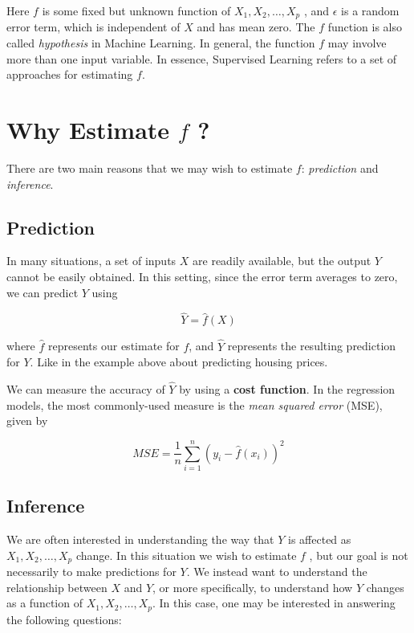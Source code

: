 \documentclass[]{book}
\begin{document}
Here \(f\) is some fixed but unknown function of
\(X_1 , X_2 ,\ldots, X_p\) , and \(\epsilon\) is a random error term,
which is independent of \(X\) and has mean zero. The \(f\) function is
also called \emph{hypothesis} in Machine Learning. In general, the
function \(f\) may involve more than one input variable. In essence,
Supervised Learning refers to a set of approaches for estimating \(f\).

\section{\texorpdfstring{Why Estimate \(f\)
?}{Why Estimate f ?}}\label{why-estimate-f}

There are two main reasons that we may wish to estimate \(f\):
\emph{prediction} and \emph{inference}.

\subsection*{Prediction}\label{prediction}

In many situations, a set of inputs \(X\) are readily available, but the
output \(Y\) cannot be easily obtained. In this setting, since the error
term averages to zero, we can predict \(Y\) using

\[ \hat{Y} = \hat{f}(X) \]

where \(\hat{f}\) represents our estimate for \(f\), and \(\hat{Y}\)
represents the resulting prediction for \(Y\). Like in the example above
about predicting housing prices.

We can measure the accuracy of \(\hat{Y}\) by using a \textbf{cost
function}. In the regression models, the most commonly-used measure is
the \emph{mean squared error} (MSE), given by

\[ MSE = \frac{1}{n} \sum_{i=1}^{n} (y_i - \hat{f}(x_i))^2\]

\subsection*{Inference}\label{inference}

We are often interested in understanding the way that \(Y\) is affected
as \(X_1 , X_2 ,\ldots, X_p\) change. In this situation we wish to
estimate \(f\) , but our goal is not necessarily to make predictions for
\(Y\). We instead want to understand the relationship between \(X\) and
\(Y\), or more specifically, to understand how \(Y\) changes as a
function of \(X_1 , X_2 ,\ldots, X_p\). In this case, one may be
interested in answering the following questions:
\end{document}
